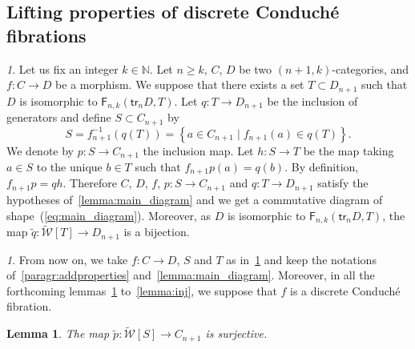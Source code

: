\documentclass[reqno]{amsart}
\theoremstyle{plain}
\newtheorem{lemma}[subsubsection]{Lemma}
\theoremstyle{definition}
\theoremstyle{remark}
\newtheorem{paragr}[subsubsection]{} %
\newcommand{\nmbr}[1]{\mathbb #1}
\newcommand{\N}{\nmbr{N}}
\newcommand{\setof}[2]{\left\{ #1\; | \; #2\right\}}
\newcommand{\pair}[2]{(#1,#2)}       %
\newcommand{\functor}[1]{\mathsf{#1}} %
\newcommand{\trk}[1]{\functor{tr}_{#1}}%
\newcommand{\frf}[1]{\functor{F}_{#1}} %
\newcommand{\clx}[2]{\pair{#1}{#2}}%
\newcommand{\WW}{\mathcal{W}}
\newcommand{\clWW}{\fcls{\WW}}
\newcommand{\wtxeq}[1]{\clWW[#1]} %
\newcommand{\fcls}[1]{\widetilde{#1}}%
\begin{document}
    
\subsection{Lifting properties of discrete Conduché fibrations}\label{subsec:lifting}
\begin{paragr}\label{paragr:generators}
 Let us fix an integer $k\in\N$.  Let $n\geq k$, $C$, $D$ be two $\pair{n{+}1}k$-categories, and $f:C\to D$ be a
 morphism. We suppose that there exists a set $T\subset D_{n+1}$ such
  that $D$ is isomorphic to $\frf{n,k}\clx{\trk nD}{T}$.
Let $q:T\to D_{n+1}$ be the inclusion of
  generators and define $S\subset C_{n+1}$ by
  \[
 S=f_{n+1}^{-1}(q(T))=\setof{a\in C_{n+1}}{f_{n+1}(a)\in q(T)}.
\]
We denote by $p:S\to C_{n+1}$ the inclusion map.
  Let $h:S\to T$ be the map taking $a\in S$ to the unique $b\in T$ such
  that $f_{n+1}p(a)=q(b)$. By definition, $f_{n+1}p=qh$. Therefore
  $C$, $D$, $f$, $p:S\to C_{n+1}$ and $q:T\to D_{n+1}$ satisfy the
  hypotheses of~\cref{lemma:main_diagram} and we get a commutative
  diagram of shape~(\ref{eq:main_diagram}). Moreover, as $D$ is
  isomorphic to $\frf{n,k}\clx{\trk nD}{T}$,
  the map $\fcls q:\wtxeq{T}\to D_{n+1}$ is a
  bijection.
  \begin{paragr}\label{paragr:hypotheses}
    From now on, we take $f:C\to D$, $S$ and $T$ as
    in~\ref{paragr:generators} and keep the notations
    of~\ref{paragr:addproperties}
    and~\cref{lemma:main_diagram}. Moreover, in all the forthcoming
    lemmas~\ref{lemma:surj} to~\ref{lemma:inj}, we suppose that $f$ is a discrete Conduché fibration.
  \end{paragr}
\end{paragr}
\begin{lemma}\label{lemma:surj}
 The map $\fcls p:\wtxeq S\to
 C_{n+1}$ is surjective.
\end{lemma}
\end{document}
